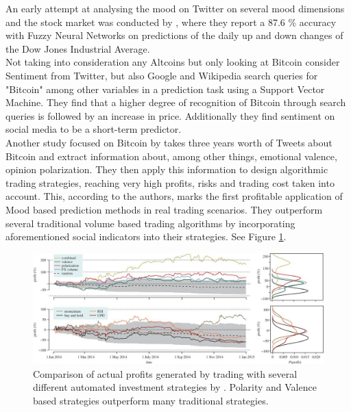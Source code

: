 \documentclass[11pt]{article}
\begin{document}
An early attempt at analysing the mood on Twitter on several mood dimensions and the stock market was conducted by \citet{BOLLEN20111}, where they report a 87.6 \% accuracy with Fuzzy Neural Networks on predictions of the daily up and down changes of the Dow Jones Industrial Average. \\
Not taking into consideration any Altcoins but only looking at Bitcoin \citet{georgoulabtc2015} consider Sentiment from Twitter, but also Google and Wikipedia search queries for "Bitcoin" among other variables in a prediction task using a Support Vector Machine. They find that a higher degree of recognition of Bitcoin through search queries is followed by an increase in price. Additionally they find sentiment on social media to be a short-term predictor. \\
Another study focused on Bitcoin by \citet{garcia2015}
takes three years worth of Tweets about Bitcoin and extract information about, among other things, emotional valence, opinion polarization. They then apply this information to design algorithmic trading strategies, reaching very high profits, risks and trading cost taken into account. This, according to the authors, marks the first profitable application of Mood based prediction methods in real trading scenarios. They outperform several traditional volume based trading algorithms by incorporating aforementioned social indicators into their strategies. See Figure \ref{fig:garciaschweitzer}. 

\begin{figure}
\centering
\includegraphics[scale=1.2]{figures/garcia_schweitzer_profits.jpg}
\caption {Comparison of actual profits generated by trading with several different automated investment strategies by \citet{garcia2015}. Polarity and Valence based strategies outperform many traditional strategies.}
\label{fig:garciaschweitzer}
\end{figure}
\end{document}
